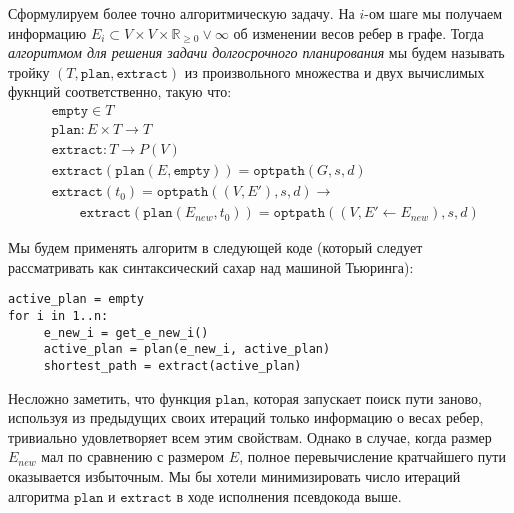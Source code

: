 \documentclass[11pt]{article}
\newcommand{\realpositive}{\mathbb{R}_{\geqslant 0}}
\begin{document}
     \pagebreak
     \newcommand{\fplan}{\mathtt{plan}}
     \newcommand{\fextract}{\mathtt{extract}}
     \newcommand{\fempty}{\mathtt{empty}}
     Сформулируем более точно алгоритмическую задачу.
     На $i$-ом шаге мы получаем информацию $E_i \subset V \times V \times \realpositive \lor \infty$ об изменении весов ребер в графе.
     Тогда \textit{алгоритмом для решения задачи долгосрочного планирования} мы будем называть тройку $(T, \fplan, \fextract)$ из произвольного множества и двух вычислимых фукнций соответственно, такую что:
     \begin{align*}
          &\fempty \in T \\
          &\fplan: E \times T \rightarrow T \\
          &\fextract: T \rightarrow P(V) \\
          &\fextract(\fplan(E, \fempty)) = \mathtt{optpath}(G, s, d) \\
          &\fextract(t_0) = \mathtt{optpath}((V, E'), s, d) \rightarrow \\
          &\qquad \fextract(\fplan(E_{new}, t_0)) = \mathtt{optpath}((V, E' \leftarrow E_{new}), s, d)
     \end{align*}

     Мы будем применять алгоритм в следующей коде (который следует рассматривать как синтаксический сахар над машиной Тьюринга):
     \begin{verbatim}
active_plan = empty
for i in 1..n:
     e_new_i = get_e_new_i()
     active_plan = plan(e_new_i, active_plan)
     shortest_path = extract(active_plan)
     \end{verbatim}
     Несложно заметить, что функция $\fplan$, которая запускает поиск пути заново, используя из предыдущих своих итераций только информацию о весах ребер, тривиально удовлетворяет всем этим свойствам.
     Однако в случае, когда размер $E_{new}$ мал по сравнению с размером $E$, полное перевычисление кратчайшего пути оказывается избыточным.
     Мы бы хотели минимизировать число итераций алгоритма $\fplan$ и $\fextract$ в ходе исполнения псевдокода выше.
\end{document}
